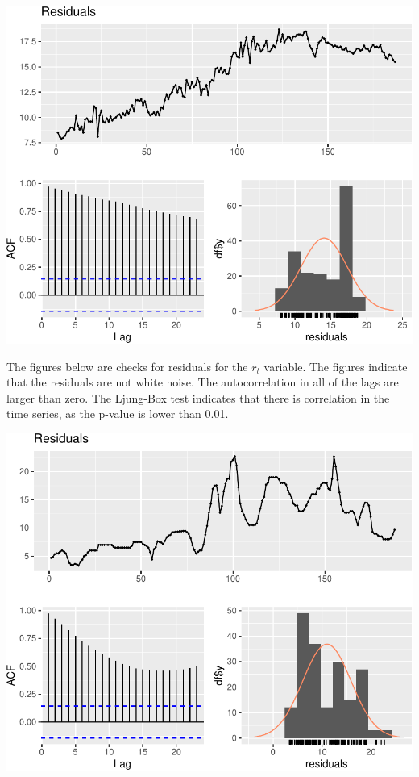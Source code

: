\documentclass[11pt,preprint, authoryear]{elsarticle}
\numberwithin{equation}{section}
\numberwithin{figure}{section}
\numberwithin{table}{section}
\begin{document}
\includegraphics{TS_proj_files/figure-latex/unnamed-chunk-25-1.pdf}

\newpage

The figures below are checks for residuals for the \(r_t\) variable. The
figures indicate that the residuals are not white noise. The
autocorrelation in all of the lags are larger than zero. The Ljung-Box
test indicates that there is correlation in the time series, as the
p-value is lower than 0.01.

\includegraphics{TS_proj_files/figure-latex/unnamed-chunk-26-1.pdf}
\end{document}
